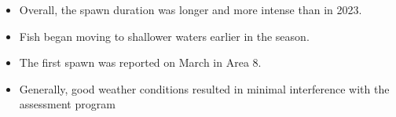 \begin{itemize}

\item Overall, the spawn duration was longer and more intense than in 2023.

\item Fish began moving to shallower waters earlier in the season.

\item The first spawn was reported on March  in Area 8.

\item Generally, good weather conditions resulted in
minimal interference with the assessment program

\end{itemize}
